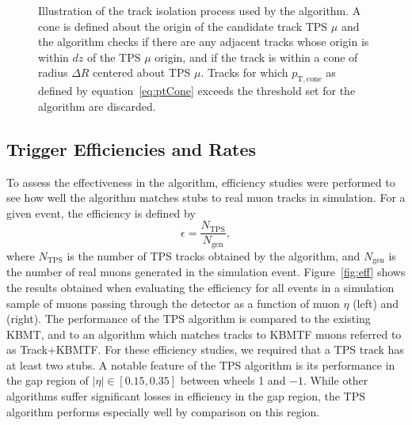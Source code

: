 \begin{figure}[htbp]
  \centering
  
  \caption{
    Illustration of the track isolation process used by the algorithm.
    A cone is defined about the origin of the candidate track TPS $\mu$ and the algorithm checks if there are any adjacent tracks whose origin is within $dz$ of the TPS $\mu$ origin, and if the track is within a cone of radius $\Delta R$ centered about TPS $\mu$.
    Tracks for which $p_\mathrm{T,cone}$ as defined by equation~\ref{eq:ptCone} exceeds the threshold set for the algorithm are discarded.
  }
  \label{fig:isol}
\end{figure}

\subsection{Trigger Efficiencies and Rates}
\label{subsec:effRates}

To assess the effectiveness in the algorithm, efficiency studies were performed to see how well the algorithm matches stubs to real muon tracks in simulation.
For a given event, the efficiency is defined by
\begin{equation}\label{eq:eff}
  \epsilon=\frac{N_\mathrm{TPS}}{N_\mathrm{gen}},
\end{equation}
where $N_\mathrm{TPS}$ is the number of TPS tracks obtained by the algorithm, and $N_\mathrm{gen}$ is the number of real muons generated in the simulation event.
Figure~\ref{fig:eff} shows the results obtained when evaluating the efficiency for all events in a simulation sample of muons passing through the detector as a function of muon $\eta$ (left) and \pt (right).
The performance of the TPS algorithm is compared to the existing KBMT, and to an algorithm which matches tracks to KBMTF muons referred to as Track+KBMTF.
For these efficiency studies, we required that a TPS track has at least two stubs.
A notable feature of the TPS algorithm is its performance in the gap region of $|\eta|\in[0.15,0.35]$ between wheels 1 and $-1$.
While other algorithms suffer significant losses in efficiency in the gap region, the TPS algorithm performs especially well by comparison on this region.

